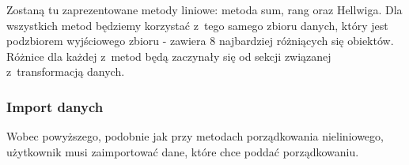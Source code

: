 \documentclass[12pt,a4paper]{report}
\begin{document}
{Zostaną tu zaprezentowane metody liniowe: metoda sum, rang oraz Hellwiga. Dla wszystkich metod będziemy korzystać z~tego samego zbioru danych, który jest podzbiorem wyjściowego zbioru - zawiera 8 najbardziej różniących się obiektów. Różnice dla każdej z~metod będą zaczynały się od sekcji związanej z~transformacją danych. 

\subsubsection{Import danych}\label{import-danych}
Wobec powyższego, podobnie jak przy metodach porządkowania nieliniowego, użytkownik musi zaimportować dane, które chce poddać porządkowaniu. 


\begin{Shaded}
\begin{Highlighting}[]
\StringTok{ }\NormalTok{(}\NormalTok{, }
                            \NormalTok{, } \NormalTok{(}\NormalTok{,}\NormalTok{, }
                           \NormalTok{, }\NormalTok{, }\NormalTok{, }\NormalTok{,                                                                              }\NormalTok{,}\NormalTok{, }\NormalTok{, }\NormalTok{, }
                              \NormalTok{, }\NormalTok{, }\NormalTok{,  }\NormalTok{, }
                              \NormalTok{, }\NormalTok{, }\NormalTok{, }\NormalTok{,}\NormalTok{, }
                                  \NormalTok{, }\NormalTok{, }\NormalTok{, }\NormalTok{, }
                                   \NormalTok{, }\NormalTok{, }\NormalTok{,                                                                              }\NormalTok{, }
                                   \NormalTok{, }\NormalTok{, }\NormalTok{))}
\end{Highlighting}
\end{Shaded}



}
\end{document}
